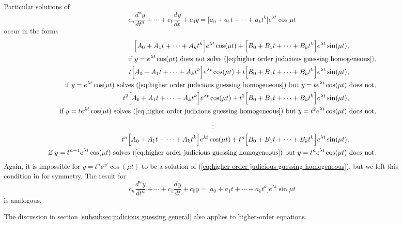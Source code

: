 \documentclass{myart}
\newcommand{\eq}[1]{(\ref{eq:#1})}
\newcommand{\deriv}[3][]{\frac{d^{#1}#2}{d#3^{#1}}}
\begin{document}
Particular solutions of
\begin{equation*}
    c_n \deriv[n]{y}{t} + \cdots + c_1 \deriv{y}{t} + c_0 y
  = \Big[a_0 + a_1 t + \cdots + a_k t^k\Big]e^{\lambda t} \cos{\mu t}
\end{equation*}
occur in the forms
\begin{align*}
    \Big[A_0 + A_1t + \cdots + A_k t^k\Big] e^{\lambda t} \cos(\mu t)
  + \Big[B_0 + B_1t + \cdots + B_k t^k\Big] e^{\lambda t} \sin(\mu t),
  \qquad \qquad \\
  \text{if $y = e^{\lambda t} \cos(\mu t)$ does not solve
        \eq{higher order judicious guessing homogeneous}}, \\
    t\Big[A_0 + A_1t + \cdots + A_k t^k\Big] e^{\lambda t} \cos(\mu t)
  + t\Big[B_0 + B_1t + \cdots + B_k t^k\Big] e^{\lambda t} \sin(\mu t),
  \qquad \qquad \\
  \text{if $y = e^{\lambda t} \cos(\mu t)$ solves
        \eq{higher order judicious guessing homogeneous}
        but $y = te^{\lambda t} \cos(\mu t)$ does not}, \\
    t^2\Big[A_0 + A_1t + \cdots + A_k t^k\Big] e^{\lambda t} \cos(\mu t)
  + t^2\Big[B_0 + B_1t + \cdots + B_k t^k\Big] e^{\lambda t} \sin(\mu t),
  \qquad \qquad \\
  \text{if $y = te^{\lambda t} \cos(\mu t)$ solves
        \eq{higher order judicious guessing homogeneous}
        but $y = t^2e^{\lambda t} \cos(\mu t)$ does not}, \\
  \vdots \hspace{239.5pt} \\
    t^n\Big[A_0 + A_1t + \cdots + A_k t^k\Big] e^{\lambda t} \cos(\mu t)
  + t^n\Big[B_0 + B_1t + \cdots + B_k t^k\Big] e^{\lambda t} \sin(\mu t),
  \qquad \qquad \\
  \text{if $y = t^{n-1}e^{\lambda t} \cos(\mu t)$ solves
        \eq{higher order judicious guessing homogeneous}
        but $y = t^n e^{\lambda t} \cos(\mu t)$ does not}.
\end{align*}
Again, it is impossible for $y = t^n e^{\gamma t} \cos(\mu t)$ to be a
solution of \eq{higher order judicious guessing homogeneous}, but we
left this condition in for symmetry. The result for
\begin{equation*}
    c_n \deriv[n]{y}{t} + \cdots + c_1 \deriv{y}{t} + c_0 y
  = \Big[a_0 + a_1 t + \cdots + a_k t^k\Big]e^{\lambda t} \sin{\mu t}
\end{equation*}
is analogous.

The discussion in section \ref{subsubsec:judicious guessing general}
also applies to higher-order equations.
\end{document}
